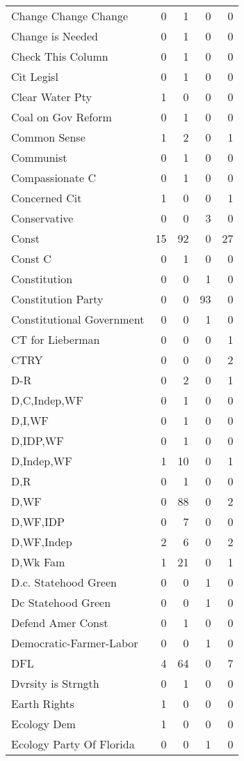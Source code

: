 \begin{supertabular}{lrrrr}
Change Change Change & 0 & 1 & 0 & 0\\
Change is Needed & 0 & 1 & 0 & 0\\
Check This Column & 0 & 1 & 0 & 0\\
Cit Legisl & 0 & 1 & 0 & 0\\
Clear Water Pty & 1 & 0 & 0 & 0\\
Coal on Gov Reform & 0 & 1 & 0 & 0\\
Common Sense & 1 & 2 & 0 & 1\\
Communist & 0 & 1 & 0 & 0\\
Compassionate C & 0 & 1 & 0 & 0\\
Concerned Cit & 1 & 0 & 0 & 1\\
Conservative & 0 & 0 & 3 & 0\\
Const & 15 & 92 & 0 & 27\\
Const C & 0 & 1 & 0 & 0\\
Constitution & 0 & 0 & 1 & 0\\
Constitution Party & 0 & 0 & 93 & 0\\
Constitutional Government & 0 & 0 & 1 & 0\\
CT for Lieberman & 0 & 0 & 0 & 1\\
CTRY & 0 & 0 & 0 & 2\\
D-R & 0 & 2 & 0 & 1\\
D,C,Indep,WF & 0 & 1 & 0 & 0\\
D,I,WF & 0 & 1 & 0 & 0\\
D,IDP,WF & 0 & 1 & 0 & 0\\
D,Indep,WF & 1 & 10 & 0 & 1\\
D,R & 0 & 1 & 0 & 0\\
D,WF & 0 & 88 & 0 & 2\\
D,WF,IDP & 0 & 7 & 0 & 0\\
D,WF,Indep & 2 & 6 & 0 & 2\\
D,Wk Fam & 1 & 21 & 0 & 1\\
D.c. Statehood Green & 0 & 0 & 1 & 0\\
Dc Statehood Green & 0 & 0 & 1 & 0\\
Defend Amer Const & 0 & 1 & 0 & 0\\
Democratic-Farmer-Labor & 0 & 0 & 1 & 0\\
DFL & 4 & 64 & 0 & 7\\
Dvrsity is Strngth & 0 & 1 & 0 & 0\\
Earth Rights & 1 & 0 & 0 & 0\\
Ecology Dem & 1 & 0 & 0 & 0\\
Ecology Party Of Florida & 0 & 0 & 1 & 0\\

\end{supertabular}
